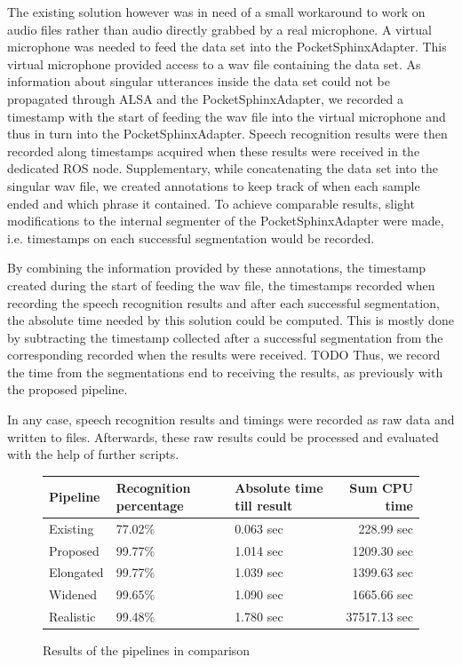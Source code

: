 The existing solution however was in need of a small workaround to work on audio files rather than audio directly grabbed by a real microphone.
A virtual microphone was needed to feed the data set into the PocketSphinxAdapter.
This virtual microphone provided access to a wav file containing the data set. 
As information about singular utterances inside the data set could not be propagated through ALSA and the PocketSphinxAdapter, we recorded a timestamp with the start of feeding the wav file into the virtual microphone and thus in turn into the PocketSphinxAdapter.
Speech recognition results were then recorded along timestamps acquired when these results were received in the dedicated ROS node.
Supplementary, while concatenating the data set into the singular wav file, we created annotations to keep track of when each sample ended and which phrase it contained.
To achieve comparable results, slight modifications to the internal segmenter of the PocketSphinxAdapter were made, i.e. timestamps on each successful segmentation would be recorded.

By combining the information provided by these annotations, the timestamp created during the start of feeding the wav file, the timestamps recorded when recording the speech recognition results and after each successful segmentation, the absolute time needed by this solution could be computed. 
This is mostly done by subtracting the timestamp collected after a successful segmentation from the corresponding recorded when the results were received. TODO
Thus, we record the time from the segmentations end to receiving the results, as previously with the proposed pipeline.

In any case, speech recognition results and timings were recorded as raw data and written to files.
Afterwards, these raw results could be processed and evaluated with the help of further scripts.

\begin{figure}[]
	\begin{tabular}{ | l | p{} | p{} | r|}
		\hline
		Pipeline 	& Recognition percentage & Absolute time till result & Sum CPU time \\ \hline
		Existing 	& 77.02\% & 0.063 sec &   228.99 sec \\ \hline
		Proposed 	& 99.77\% & 1.014 sec &  1209.30 sec \\ \hline
		Elongated 	& 99.77\% & 1.039 sec &  1399.63 sec \\ \hline
		Widened 	& 99.65\% & 1.090 sec &  1665.66 sec \\ \hline
		Realistic 	& 99.48\% & 1.780 sec & 37517.13 sec \\ \hline
	\end{tabular}
	\caption{Results of the pipelines in comparison}
	\label{table:eval_dataset_results}
\end{figure}

